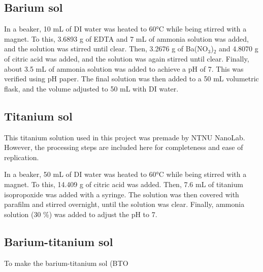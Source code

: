 \subsection{Barium sol}

In a beaker, 10 mL of DI water was heated to 60°C while being stirred with a magnet.
To this, 3.6893 g of EDTA and 7 mL of ammonia solution was added, and the solution was stirred until clear.
Then, 3.2676 g of Ba(NO$_3$)$_2$ and 4.8070 g of citric acid was added, and the solution was again stirred until clear.
Finally, about 3.5 mL of ammonia solution was added to achieve a pH of 7. 
This was verified using pH paper.
The final solution was then added to a 50 mL volumetric flask, and the volume adjusted to 50 mL with DI water.

\subsection{Titanium sol}

This titanium solution used in this project was premade by NTNU NanoLab.
However, the processing steps are included here for completeness and ease of replication.

In a beaker, 50 mL of DI water was heated to 60°C while being stirred with a magnet.
To this, 14.409 g of citric acid was added.
Then, 7.6 mL of titanium isopropoxide was added with a syringe.
The solution was then covered with parafilm and stirred overnight, until the solution was clear.
Finally, ammonia solution (30 \%) was added to adjust the pH to 7.

\subsection{Barium-titanium sol}

To make the barium-titanium sol (BTO